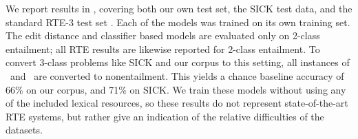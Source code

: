 We report results in , covering both our own test set,
  the SICK test data, and the standard RTE-3 test set \cite{giampiccolo2007third}.
Each of the models was trained on its own training set.
The edit distance and classifier based models are evaluated only on
  2-class entailment; all RTE results are likewise reported for 2-class entailment.
To convert 3-class problems like SICK and our corpus to this setting, all instances
  of \contradiction\ and \unknown\ are converted to nonentailment.
This yields a chance baseline accuracy of 66\% on our corpus, and 71\% on SICK.
We train these models without using any of the included lexical
  resources, so these results do not represent state-of-the-art
  RTE systems, but rather give an indication of the relative
  difficulties of the datasets.


%
%
